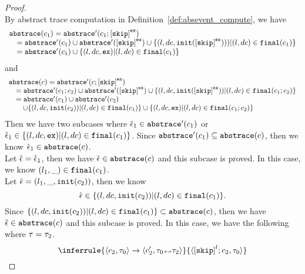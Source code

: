 \begin{proof}
\[    \]
    By abstract trace computation in Definition~\ref{def:absevent_compute}, we have
    \[
      \begin{array}{l}
        \absflow(c_1) = \absflow'(c_1; \clabel{\eskip}^{\lex}) 
        \\ \quad
        = \absflow'(c_1) \cup \absflow'(\clabel{\eskip}^{\lex}) 
        \cup \{ (l, dc, \absinit(\clabel{\eskip}^{\lex}))) | (l, dc) \in \absfinal(c_1) \} 
        \\ \quad
        = \absflow'(c_1) \cup  \{ (l, dc, \lex) | (l, dc) \in \absfinal(c_1) \} 
     \end{array}
    \]  
    and 
    \[
      \begin{array}{l}
        \absflow(c) = \absflow'(c; \clabel{\eskip}^{\lex}) 
        \\ \quad
        = \absflow'(c_1;c_2) \cup \absflow'(\clabel{\eskip}^{\lex}) 
        \cup \{ (l, dc, \absinit(\clabel{\eskip}^{\lex})) | (l, dc) \in \absfinal(c_1; c_2) \} 
        \\ \quad  
        = \absflow'(c_1) \cup \absflow'(c_2) 
        \\ \quad \quad
        \cup \{ (l, dc, \absinit(c_2)) | (l, dc) \in \absfinal(c_1) \} 
        \cup \{ (l, dc, \lex) | (l, dc) \in \absfinal(c_1; c_2) \} 
     \end{array}
    \]
    Then we have two subcases where 
    $\hat{\mathtt{\epsilon}{}}_1 \in \mathtt{abs}{\mathtt{trace}}'(c_1)$ or $\hat{\mathtt{\epsilon}{}}_1 \in \{ (l, dc, \mathtt{ex}) | (l, dc) \in \mathtt{final}(c_1) \}$.
    Since $\mathtt{abs}{\mathtt{trace}}'(c_1) \subseteq \mathtt{abs}{\mathtt{trace}}(c)$, then we know $\hat{\mathtt{\epsilon}{}}_1 \in \mathtt{abs}{\mathtt{trace}}(c)$.
    \\
    Let $\hat{\mathtt{\epsilon}{}} = \hat{\mathtt{\epsilon}{}}_1$, then we have $\hat{\mathtt{\epsilon}{}} \in \mathtt{abs}{\mathtt{trace}}(c)$ and this subcase is proved.
    In this case, we know $(l_1, \_) \in \mathtt{final}(c_1)$.
    \\
    Let $\hat{\mathtt{\epsilon}{}} = (l_1, \_, \mathtt{init}(c_2))$, then we know 
    \[
      \hat{\mathtt{\epsilon}{}} \in   \{ (l, dc, \mathtt{init}(c_2)) | (l, dc) \in \mathtt{final}(c_1) \}. 
    \]
    Since $\{ (l, dc, \mathtt{init}(c_2)) | (l, dc) \in \mathtt{final}(c_1) \}  \subset\mathtt{abs}{\mathtt{trace}}(c)$,  then we have $\hat{\mathtt{\epsilon}{}} \in \mathtt{abs}{\mathtt{trace}}(c)$ and this subcase is proved.
    In this case, we have the following where $\mathtt{\tau} = \mathtt{\tau}_2$.
    \[
      \inferrule
      {
      \config{{c_2, \trace_0}}
      \xrightarrow{}
      \config{{c_2',  \trace_0 \tracecat \trace_2}}
      }
      {
      \config{{\clabel{\eskip}^l; c_2, \trace_0}} 
}\]
\end{proof}
